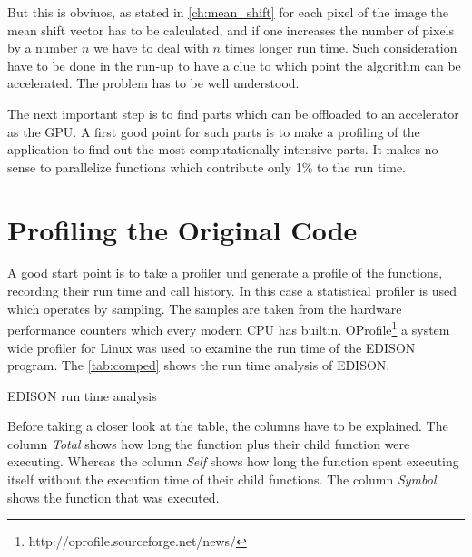 But this is obviuos, as stated in \autoref{ch:mean_shift} for each
pixel of the image the mean shift vector has to be calculated, and if
one increases the number of pixels by a number $n$ we have to deal
with $n$ times longer run time. Such consideration have to be done in
the run-up to have a clue to which point the algorithm can be
accelerated. The problem has to be well understood.

The next important step is to find parts which can be offloaded to an
accelerator as the \gls{GPU}. A first good point for such parts is to
make a profiling of the application to find out the most
computationally intensive parts. It makes no sense to parallelize
functions which contribute only 1\% to the run time.
    
\section{Profiling the Original Code} %
\label{sec:run_time_analysis_of_the_original_code}
A good start point is to take a profiler und generate a profile of the
functions, recording their run time and call history. In this case a
statistical profiler is used which operates by sampling. The samples
are taken from the hardware performance counters which every modern
\gls{CPU} has builtin.
OProfile\footnote{http://oprofile.sourceforge.net/news/} a system wide
profiler for Linux was used to examine the run time of the
\gls{EDISON} program. The \autoref{tab:comped} shows the run time
analysis of \gls{EDISON}.

\begin{table}[ht]
  \centering
  \caption[EDISON run time profile]{ \gls{EDISON} run time analysis}
  \label{tab:comped}
\end{table}

Before taking a closer look at the table, the columns have to be
explained. The column \emph{Total} shows how long the function plus
their child function were executing. Whereas the column \emph{Self}
shows how long the function spent executing itself without the
execution time of their child functions. The column \emph{Symbol}
shows the function that was executed.

